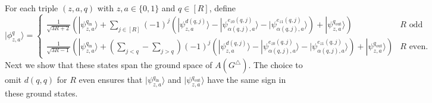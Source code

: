 \documentclass[../thesis-main/thesis-main]{subfiles}
\begin{document}
%
%
%
%

For each triple $(z,a,q)$ with $z,a\in\{0,1\}$ and $q\in[R]$, define
\begin{equation}
|\phi_{z,a}^{q}\rangle=\begin{cases}
\frac{1}{\sqrt{3R+2}}\left(|\psi_{z,a}^{q_{\mathrm{in}}}\rangle+\sum_{j\in[R]}\left(-1\right)^{j}\left(|\psi_{z,a}^{d(q,j)}\rangle-|\psi_{\alpha(q,j),a}^{e_{z0}(q,j)}\rangle-|\psi_{\alpha(q,j),a}^{e_{z1}(q,j)}\rangle\right)+|\psi_{z,a}^{q_{\mathrm{out}}}\rangle\right) & R\text{ odd}\\
\frac{1}{\sqrt{3R-1}}\left(|\psi_{z,a}^{q_{\mathrm{in}}}\rangle+\left(\sum_{j<q}-\sum_{j>q}\right)\left(-1\right)^{j}\left(|\psi_{z,a}^{d(q,j)}\rangle-|\psi_{\alpha(q,j),a}^{e_{z0}(q,j)}\rangle-|\psi_{\alpha(q,j),a}^{e_{z1}(q,j)}\rangle\right)+|\psi_{z,a}^{q_{\mathrm{out}}}\rangle\right) & R\text{ even.}
\end{cases}\label{eq:phi_z_a_q}
\end{equation}
Next we show that these states span the ground space of $A(G^{\triangle})$.  The choice to omit $d(q,q)$ for $R$ even ensures that $|\psi^{q_{\text{in}}}_{z,a}\rangle$ and $|\psi^{q_{\text{out}}}_{z,a}\rangle$ have the same sign in these ground states.
\end{document}
